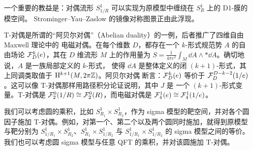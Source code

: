 一个重要的教益是：对偶流形 $S^1_{1/R}$ 可以实现为原模型中缠绕在 $S^1_R$ 上的 D1-膜的模空间。
Strominger–Yau–Zaslow 的镜像对称图景正由此浮现。


T-对偶是所谓的“阿贝尔对偶”（Abelian duality）的一例，后者推广了四维自由 Maxwell 理论中的
电磁对偶。在每个维数 $D$，都存在一个 $k$-形式规范势 $A$ 的自由场论 $\mathcal{F}^k_D(e)$，其在 $D$ 维流形 $M$
上的作用量为 $S=\frac{1}{4\pi e^2}\int_M\dd A\wedge*\dd A$。确切地说，$A$ 是一族局部定义的 $k$-形式，
使得 $\dd A$ 是整体定义的闭 $(k+1)$-形式，其上同调类取值于 $\mathrm{H}^{k+1}(M,2\pi\mathbb{Z})$。阿贝尔对偶
断言：$\mathcal{F}^k_D(e)$ 等价于 $\mathcal{F}^{D-k-2}_D(1/e)$。这可以像 T-对偶那样用路径积分论证说明，其中 $J$ 是
一个 $(k+1)$-形式变量。T-对偶是 $\mathcal{F}^0_2(1/R)\cong\mathcal{F}^0_2(R)$，而电磁对偶是
$\mathcal{F}^1_4(e)\cong\mathcal{F}^1_4(1/e)$。


我们可以考虑圆的乘积，比如 $S^1_{R_1}\times S^1_{R_2}$，作为 sigma 模型的靶空间，并对各个圆因子施加
T-对偶。例如，对第一个、第二个以及两个圆同时施加，就得到原模型与靶分别为
$S^1_{1/R_1}\times S^1_{R_2}$、$S^1_{R_1}\times S^1_{1/R_2}$ 与 $S^1_{1/R_1}\times S^1_{1/R_2}$ 的
sigma 模型之间的等价。我们也可以考虑圆 sigma 模型与任意 QFT 的乘积，并对该圆施加 T-对偶。

